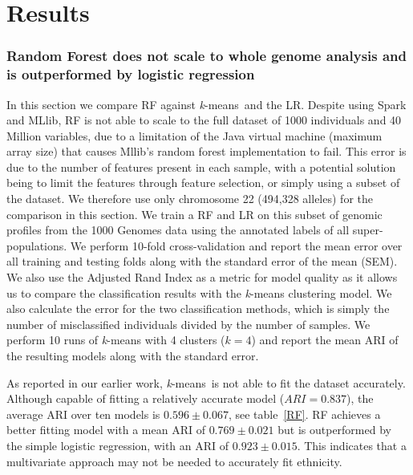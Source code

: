 \documentclass{llncs}
\newcommand{\kMeans}{\textit{k}-means}
\begin{document}
{\section{Results}

\subsubsection{Random Forest does not scale to whole genome analysis and is outperformed by logistic regression}
In this section we compare RF against \kMeans\ and the LR.  
Despite using {\sc Spark} and {\sc MLlib}, RF is not able to scale to the full dataset of 1000 individuals and 40
Million variables, due to a limitation of the Java virtual machine (maximum array size) that causes {\sc Mllib}'s
random forest implementation to fail. This error is due to the number of features present in each sample,
with a potential solution being to limit the features through feature selection, or simply using a subset of the dataset.
We therefore use only chromosome 22 (494,328 alleles) for the comparison in this section.  We train a RF
and LR on this subset of genomic profiles from the 1000 Genomes data using the annotated labels of all
super-populations.  We perform 10-fold cross-validation and report the mean error over all training and testing folds
along with the standard error of the mean (SEM). We also use the Adjusted Rand Index as a metric for model quality
as it allows us to compare the classification results with the \kMeans{} clustering model. We also calculate the error
for the two classification methods, which is simply the number of misclassified individuals divided by the number of samples.
We perform 10 runs of \kMeans{} with 4 clusters (\(k=4\)) and report the mean ARI of the
resulting models along with the standard error.

As reported in our earlier work, \kMeans\ is not able to fit the dataset accurately.
Although capable of fitting a relatively accurate model (\(ARI=0.837\)), the average ARI over ten models is  \(0.596 \pm 0.067\), see table~\ref{RF}.
RF achieves a better fitting model with a mean ARI of \(0.769 \pm 0.021\) but is outperformed by the simple logistic regression, with an ARI of \(0.923 \pm 0.015\).
This indicates that a multivariate approach may not be needed to accurately fit ethnicity. 


}
\end{document}
